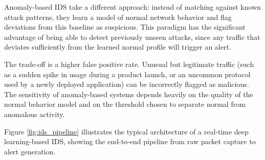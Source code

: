 \par Anomaly-based IDS take a different approach: instead of matching against known attack patterns, they learn a model of normal network behavior and flag deviations from this baseline as suspicious. This paradigm has the significant advantage of being able to detect previously unseen attacks, since any traffic that deviates sufficiently from the learned normal profile will trigger an alert.

\par The trade-off is a higher false positive rate. Unusual but legitimate traffic (such as a sudden spike in usage during a product launch, or an uncommon protocol used by a newly deployed application) can be incorrectly flagged as malicious. The sensitivity of anomaly-based systems depends heavily on the quality of the normal behavior model and on the threshold chosen to separate normal from anomalous activity.

\par Figure \ref{fig:ids_pipeline} illustrates the typical architecture of a real-time deep learning-based IDS, showing the end-to-end pipeline from raw packet capture to alert generation.

